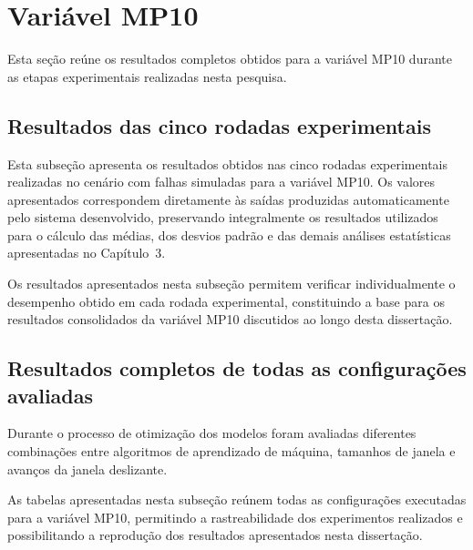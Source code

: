 
\section{Variável MP10}

Esta seção reúne os resultados completos obtidos para a variável MP10 durante as etapas experimentais realizadas nesta pesquisa.

\subsection{Resultados das cinco rodadas experimentais}

Esta subseção apresenta os resultados obtidos nas cinco rodadas experimentais realizadas no cenário com falhas simuladas para a variável MP10. Os valores apresentados correspondem diretamente às saídas produzidas automaticamente pelo sistema desenvolvido, preservando integralmente os resultados utilizados para o cálculo das médias, dos desvios padrão e das demais análises estatísticas apresentadas no Capítulo~3.

\clearpage

\begingroup
\footnotesize
\setlength{\tabcolsep}{2pt}
\renewcommand{\arraystretch}{0.95}
\setlength{\LTleft}{0pt}
\setlength{\LTright}{0pt}



\endgroup

\clearpage

Os resultados apresentados nesta subseção permitem verificar individualmente o desempenho obtido em cada rodada experimental, constituindo a base para os resultados consolidados da variável MP10 discutidos ao longo desta dissertação.

\subsection{Resultados completos de todas as configurações avaliadas}

Durante o processo de otimização dos modelos foram avaliadas diferentes combinações entre algoritmos de aprendizado de máquina, tamanhos de janela e avanços da janela deslizante.

As tabelas apresentadas nesta subseção reúnem todas as configurações executadas para a variável MP10, permitindo a rastreabilidade dos experimentos realizados e possibilitando a reprodução dos resultados apresentados nesta dissertação.

